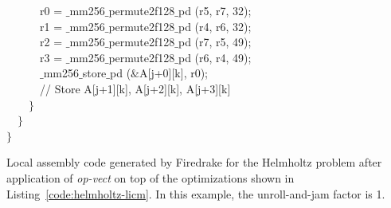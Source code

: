\begin{algorithm}
\begin{multicols}{2}
~~~~~~r0 = $\_$mm256$\_$permute2f128$\_$pd (r5, r7, 32);\\
~~~~~~r1 = $\_$mm256$\_$permute2f128$\_$pd (r4, r6, 32);\\
~~~~~~r2 = $\_$mm256$\_$permute2f128$\_$pd (r7, r5, 49);\\
~~~~~~r3 = $\_$mm256$\_$permute2f128$\_$pd (r6, r4, 49);\\
~~~~~~$\_$mm256$\_$store$\_$pd ($\&$A[j+0][k], r0);\\
~~~~~~// Store A[j+1][k], A[j+2][k], A[j+3][k]\\
~~~~$\rbrace$\\
~~$\rbrace$\\
$\rbrace$
\end{multicols}
\caption{Local assembly code generated by Firedrake for the Helmholtz
  problem after application of \emph{op-vect} on top of the
  optimizations shown in Listing~\ref{code:helmholtz-licm}. In this
  example, the unroll-and-jam factor is 1.}
\label{code:helmholtz-opvect}
\end{algorithm}

